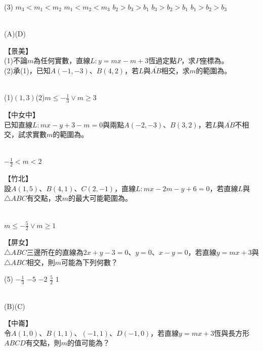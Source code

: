 \documentclass
[answers]
{exam}
\newcommand\ul[1]{\uline{\hspace*{#1}}}
\theoremstyle{definition}
\begin{document}
\begin{questions}
\begin{tasks}(3)
	\task $m_3<m_1<m_2$
	\task $m_1<m_2<m_3$
	\task $b_2>b_3>b_1$
	\task $b_3>b_2>b_1$
	\task $b_1>b_2>b_3$
\end{tasks}

\begin{solution}~\\
	(A)(D)
\end{solution}


\question
【景美】\\
(1)不論$m$為任何實數，直線$L:y=mx-m+3$恆過定點$P$，求$P$座標為\ul{50pt}。\\
(2)承(1)，已知$A\left( -1,-3\right)$、$B\left( 4,2\right)$，若$L$與$\overline{AB}$相交，求$m$的範圍為\ul{50pt}。

\begin{solution}~\\
	(1)$ \left(  1,3 \right)$(2)$m \leq - \frac{1}{3} \vee m \geq 3$
\end{solution}

\question
【中女中】\\
已知直線$L:mx-y+3-m=0$與兩點$A\left( -2,-3\right)$、$B\left( 3,2\right)$，若$L$與$\overline{AB}$不相交，試求實數$m$的範圍為\ul{50pt}。
\begin{solution}~\\
	$-\frac{1}{2} < m < 2$
\end{solution}

\question
【竹北】\\
設$A\left( 1,5\right)$、$B\left( 4,1\right)$、$C\left( 2,-1\right)$，直線$L:mx-2m-y+6=0$，若直線$L$與$\triangle ABC$有交點，求$m$的最大可能範圍為\ul{50pt}。
\begin{solution}~\\
		$m \leq - \frac{5}{2} \vee m \geq 1$
\end{solution}

\question
【屏女】\\
$\triangle ABC$三邊所在的直線為$2x+y-3=0$、$y=0$、$x-y=0$，若直線$y=mx+3$與$\triangle ABC$相交，則$m$可能為下列何數？

\begin{tasks}(5)
	\task $-\frac{1}{3}$
	\task $ -5$
	\task $-2$
	\task $\frac{5}{2}$
	\task $1$
\end{tasks}
\begin{solution}~\\
	(B)(C)
\end{solution}

\question
【中崙】\\
令$A\left( 1,0\right)$、$B\left( 1,1\right)$、$\left( -1,1\right)$、$D\left( -1,0\right)$，若直線$y=mx+3$恆與長方形$ABCD$有交點，則$m$的值可能為？


\end{questions}
\end{document}
